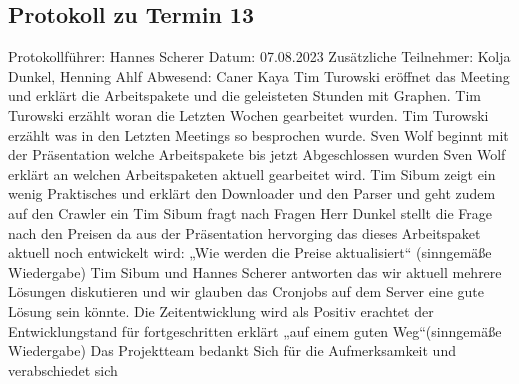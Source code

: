 \subsection{Protokoll zu Termin 13}
Protokollführer: Hannes Scherer \newline
Datum: 07.08.2023 \newline
Zusätzliche Teilnehmer: Kolja Dunkel, Henning Ahlf  \newline
Abwesend: Caner Kaya \newline \newline
Tim Turowski eröffnet das Meeting und erklärt die Arbeitspakete und die geleisteten Stunden mit Graphen. 
Tim Turowski erzählt woran die Letzten Wochen gearbeitet wurden.
Tim Turowski erzählt was in den Letzten Meetings so besprochen wurde.
Sven Wolf beginnt mit der Präsentation welche Arbeitspakete bis jetzt Abgeschlossen wurden
Sven Wolf erklärt an welchen Arbeitspaketen aktuell gearbeitet wird. 
Tim Sibum zeigt ein wenig Praktisches und erklärt den Downloader und den Parser und geht zudem auf den Crawler ein
Tim Sibum fragt nach Fragen
Herr Dunkel stellt die Frage nach den Preisen da aus der Präsentation hervorging das dieses Arbeitspaket aktuell noch entwickelt wird: „Wie werden die Preise aktualisiert“ (sinngemäße Wiedergabe) 
Tim Sibum und Hannes Scherer antworten das wir aktuell mehrere Lösungen diskutieren und wir glauben das Cronjobs auf dem Server eine gute Lösung sein könnte.
Die Zeitentwicklung wird als Positiv erachtet der Entwicklungstand für fortgeschritten erklärt „auf einem guten Weg“(sinngemäße Wiedergabe)
Das Projektteam bedankt Sich für die Aufmerksamkeit und verabschiedet sich

